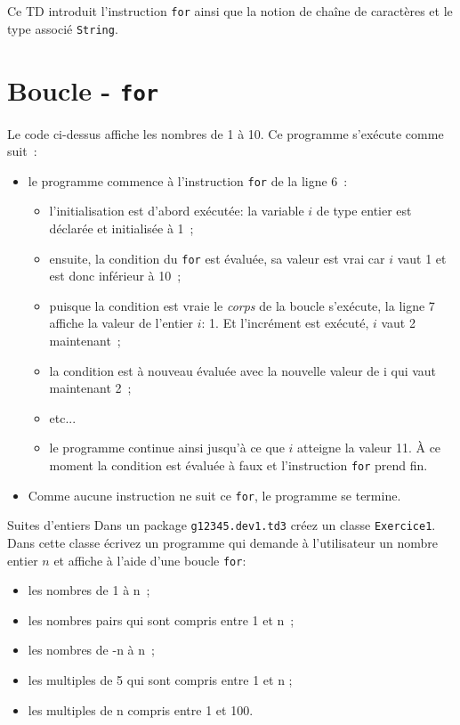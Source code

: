 \documentclass[a4paper,11pt]{article}
\date{2018 -- 2019}
\begin{document}
\entete
\titre
{}
\lastedit


	Ce TD introduit l'instruction \texttt{for} ainsi que la notion de chaîne de caractères et le type
	associé \texttt{String}.
	 
	\tableofcontents

	\newpage

\section{Boucle - \texttt{for}}

	Le code ci-dessus affiche les nombres de 1 à 10.
	Ce programme s'exécute comme suit~:
	\begin{itemize}
		\item  le programme commence à l'instruction \texttt{for} de la ligne 6~:
			\begin{itemize}
				\item l'initialisation  est d'abord exécutée: 
					la variable $i$ de type entier est déclarée et initialisée à 1~;
				\item  ensuite, la condition du \texttt{for} 
					est évaluée, sa valeur est vrai car $i$ vaut 1 et est donc inférieur à 10~;
				\item puisque la condition est vraie le \emph{corps} de la boucle s'exécute, 
					la ligne 7 affiche la valeur de l'entier $i$: 1. 
					Et l'incrément  est exécuté, $i$ vaut 2 maintenant~;
				\item la condition est à nouveau évaluée avec la nouvelle valeur de i qui vaut maintenant 2~;
				\item etc...
				\item le programme continue ainsi jusqu'à ce que $i$ atteigne la valeur 11. 
					\`A ce moment la condition est évaluée à faux et l'instruction 
					\texttt{for} prend fin.
			\end{itemize}
		\item	Comme aucune instruction ne suit ce \texttt{for}, le programme se termine.

	\end{itemize}

 
	\begin{Exercice}{Suites d'entiers}	
		Dans un package \texttt{g12345.dev1.td3} créez un classe \texttt{Exercice1}.
		Dans cette classe écrivez un programme qui demande à l'utilisateur un nombre entier $n$ et affiche
		à l'aide d'une boucle \texttt{for}:
		\begin{itemize}
			\item  les nombres de 1 à n~;
			\item  les nombres pairs qui sont compris entre 1 et n~;
			\item les nombres de -n à n~;
			\item les multiples de 5 qui sont compris entre 1 et n ;
			\item les multiples de n compris entre 1 et 100.
		\end{itemize}
	\end{Exercice} 
 
\end{document}
